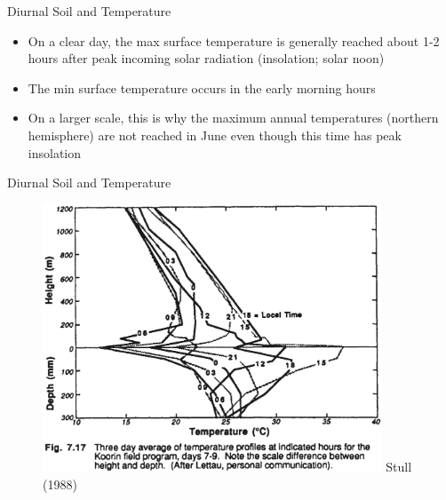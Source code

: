 \begin{frame}{Diurnal Soil and  Temperature}
\begin{itemize}
	\item On a clear day, the max surface temperature is generally reached about 1-2 hours after peak incoming solar radiation (insolation; solar noon)
	\item The min surface temperature occurs in the early morning hours
	\item On a larger scale, this is why the maximum annual temperatures (northern hemisphere) are not reached in June even though this time has peak insolation
\end{itemize}
\end{frame}

\begin{frame}{Diurnal Soil and  Temperature}
\begin{figure}
	\includegraphics[width=0.9\textwidth]{fig2.png}
	\newline \centering \tiny Stull (1988)
\end{figure}
\end{frame}



